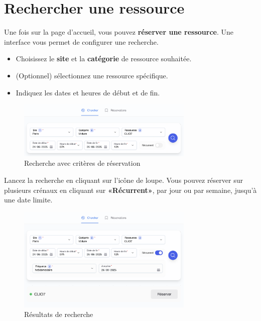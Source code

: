 \documentclass[a4paper,12pt]{article}
\begin{document}
\newpage

\section{Rechercher une ressource}

Une fois sur la page d’accueil, vous pouvez  \textbf{réserver une ressource}. Une interface vous permet de configurer une recherche.

\begin{itemize}
    \item Choisissez le \textbf{site} et la \textbf{catégorie} de ressource souhaitée.
    \item (Optionnel) sélectionnez une ressource spécifique.
    \item Indiquez les dates et heures de début et de fin.
\end{itemize}

\begin{figure}[h!]
    \centering
    \includegraphics[width=0.75\textwidth]{UTILISATEUR/SEARCH_WITH_PARAMETERS.png}
    \caption{Recherche avec critères de réservation}
    \label{fig:search-parameters}
\end{figure}

Lancez la recherche en cliquant sur l’icône de loupe. Vous pouvez réserver sur plusieurs crénaux en cliquant sur \textbf{«Récurrent»}, par jour ou par semaine, jusqu'à une date limite.

\begin{figure}[h!]
    \centering
    \includegraphics[width=0.75\textwidth]{UTILISATEUR/SEARCH_WITH_RESULTS.png}
    \caption{Résultats de recherche}
    \label{fig:search-results}
\end{figure}
\end{document}
